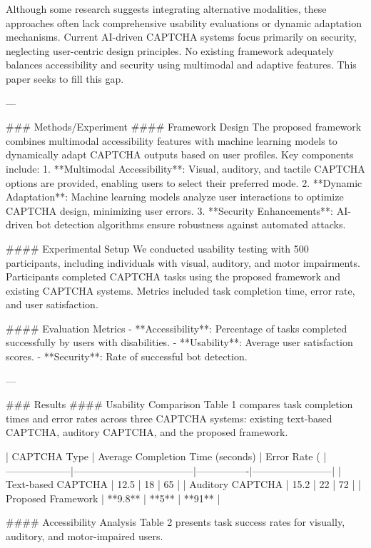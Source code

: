 Although some research suggests integrating alternative modalities, these approaches often lack comprehensive usability evaluations or dynamic adaptation mechanisms. Current AI-driven CAPTCHA systems focus primarily on security, neglecting user-centric design principles. No existing framework adequately balances accessibility and security using multimodal and adaptive features. This paper seeks to fill this gap.

---

### Methods/Experiment
#### Framework Design
The proposed framework combines multimodal accessibility features with machine learning models to dynamically adapt CAPTCHA outputs based on user profiles. Key components include:
1. **Multimodal Accessibility**: Visual, auditory, and tactile CAPTCHA options are provided, enabling users to select their preferred mode.
2. **Dynamic Adaptation**: Machine learning models analyze user interactions to optimize CAPTCHA design, minimizing user errors.
3. **Security Enhancements**: AI-driven bot detection algorithms ensure robustness against automated attacks.

#### Experimental Setup
We conducted usability testing with 500 participants, including individuals with visual, auditory, and motor impairments. Participants completed CAPTCHA tasks using the proposed framework and existing CAPTCHA systems. Metrics included task completion time, error rate, and user satisfaction. 

#### Evaluation Metrics
- **Accessibility**: Percentage of tasks completed successfully by users with disabilities.
- **Usability**: Average user satisfaction scores.
- **Security**: Rate of successful bot detection.

---

### Results
#### Usability Comparison
Table 1 compares task completion times and error rates across three CAPTCHA systems: existing text-based CAPTCHA, auditory CAPTCHA, and the proposed framework.

| CAPTCHA Type       | Average Completion Time (seconds) | Error Rate (%
|--------------------|------------------------------------|----------------|------------------------|
| Text-based CAPTCHA | 12.5                             | 18             | 65                     |
| Auditory CAPTCHA   | 15.2                             | 22             | 72                     |
| Proposed Framework | **9.8**                          | **5**          | **91**                 |

#### Accessibility Analysis
Table 2 presents task success rates for visually, auditory, and motor-impaired users.

